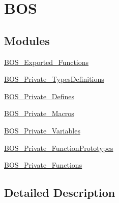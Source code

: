 \hypertarget{group___b_o_s}{}\section{B\+OS}
\label{group___b_o_s}
\subsection*{Modules}
\begin{DoxyCompactItemize}
\item 
\mbox{\hyperlink{group___b_o_s___exported___functions}{B\+O\+S\+\_\+\+Exported\+\_\+\+Functions}}
\item 
\mbox{\hyperlink{group___b_o_s___private___types_definitions}{B\+O\+S\+\_\+\+Private\+\_\+\+Types\+Definitions}}
\item 
\mbox{\hyperlink{group___b_o_s___private___defines}{B\+O\+S\+\_\+\+Private\+\_\+\+Defines}}
\item 
\mbox{\hyperlink{group___b_o_s___private___macros}{B\+O\+S\+\_\+\+Private\+\_\+\+Macros}}
\item 
\mbox{\hyperlink{group___b_o_s___private___variables}{B\+O\+S\+\_\+\+Private\+\_\+\+Variables}}
\item 
\mbox{\hyperlink{group___b_o_s___private___function_prototypes}{B\+O\+S\+\_\+\+Private\+\_\+\+Function\+Prototypes}}
\item 
\mbox{\hyperlink{group___b_o_s___private___functions}{B\+O\+S\+\_\+\+Private\+\_\+\+Functions}}
\end{DoxyCompactItemize}


\subsection{Detailed Description}
